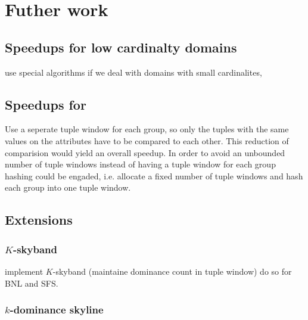 \section{Futher work}

\subsection{Speedups for low cardinalty domains}
%
use special algorithms if we deal with domains with small cardinalites, \citep{Preisinger2006, Preisinger2007, Morse2007}

\subsection{Speedups for }
%
Use a seperate tuple window for each 
group, so only the tuples with the same values on the
 attributes have to be compared to each
other. This reduction of comparision would yield an overall speedup.
In order to avoid an unbounded number of tuple windows instead of
having a tuple window for each  group
hashing could be engaded, i.e. allocate a fixed number of tuple
windows and hash each  group into one tuple
window.


\subsection{Extensions}

\subsubsection{$K$-skyband}
implement $K$-skyband (maintaine dominance count in tuple window) do so for BNL and SFS.

\subsubsection{$k$-dominance skyline}






